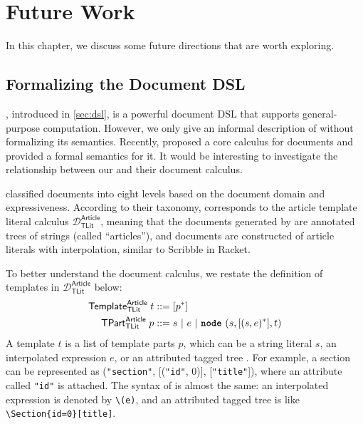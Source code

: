 \chapter{Future Work} \label{ch:conclusion}

In this chapter, we discuss some future directions that are worth exploring.

\section{Formalizing the Document DSL}

\newcommand{\DArtTLit}{$\mathcal{D}^\mathsf{Article}_\mathsf{TLit}$\xspace}
\newcommand{\DArtTProg}{$\mathcal{D}^\mathsf{Article}_\mathsf{TProg}$\xspace}
\newcommand{\kw}[1]{\text{\ttfamily\bfseries #1}}

\ExT, introduced in \autoref{sec:dsl}, is a powerful document DSL that supports
general-purpose computation. However, we only give an informal description of
\ExT without formalizing its semantics. Recently, \citet{crichton2024core}
proposed a core calculus for documents and provided a formal semantics for it.
It would be interesting to investigate the relationship between our \ExT and
their document calculus.

\citeauthor{crichton2024core} classified documents into eight levels based on
the document domain and expressiveness. According to their taxonomy, \ExT
corresponds to the article template literal calculus \DArtTLit, meaning that the
documents generated by \ExT are annotated trees of strings (called
``articles''), and documents are constructed of article literals with
interpolation, similar to Scribble in Racket.

To better understand the document calculus, we restate the definition of
templates in \DArtTLit below:
\begin{align*}
\mathsf{Template}^\mathsf{Article}_\mathsf{TLit} \; t&::= [p^*] \\
   \mathsf{TPart}^\mathsf{Article}_\mathsf{TLit} \; p&::= s ~|~ e ~|~ \kw{node}\ (s, [(s,e)^*], t)
\end{align*}
A template $t$ is a list of template parts $p$, which can be a string literal
$s$, an interpolated expression $e$, or an attributed tagged tree \kw{node}. For
example, a section can be represented as \kw{node} (\lstinline{"section"},
[(\lstinline{"id"}, 0)], [\lstinline{"title"}]), where an attribute called
\lstinline{"id"} is attached. The syntax of \ExT is almost the same: an
interpolated expression is denoted by \lstinline{\(e)}, and an attributed tagged
tree is like \lstinline|\Section{id=0}[title]|.

